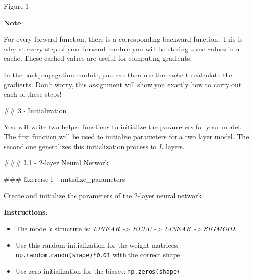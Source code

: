 \documentclass[11pt]{article}
\providecommand{\tightlist}{%
      \setlength{\itemsep}{0pt}\setlength{\parskip}{0pt}}
\begin{document}
Figure 1

\textbf{Note}:

For every forward function, there is a corresponding backward function.
This is why at every step of your forward module you will be storing
some values in a cache. These cached values are useful for computing
gradients.

In the backpropagation module, you can then use the cache to calculate
the gradients. Don't worry, this assignment will show you exactly how to
carry out each of these steps!

    \#\# 3 - Initialization

You will write two helper functions to initialize the parameters for
your model. The first function will be used to initialize parameters for
a two layer model. The second one generalizes this initialization
process to \(L\) layers.

\#\#\# 3.1 - 2-layer Neural Network

\#\#\# Exercise 1 - initialize\_parameters

Create and initialize the parameters of the 2-layer neural network.

\textbf{Instructions}:

\begin{itemize}
\tightlist
\item
  The model's structure is: \emph{LINEAR -\textgreater{} RELU
  -\textgreater{} LINEAR -\textgreater{} SIGMOID}.
\item
  Use this random initialization for the weight matrices:
  \texttt{np.random.randn(shape)*0.01} with the correct shape
\item
  Use zero initialization for the biases: \texttt{np.zeros(shape)}
\end{itemize}
\end{document}
